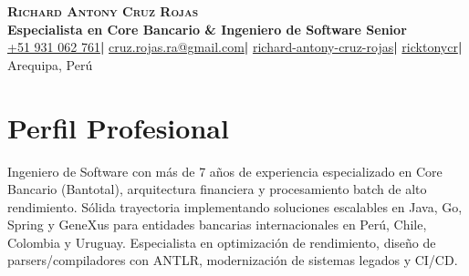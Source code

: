 \documentclass[letterpaper,10pt]{article}
\newcommand{\sep}{\hspace{4.5pt}\textcolor{linkcolor}{\small\textbf{|}}\hspace{4.5pt}}
\begin{document}

\begin{center}
    {\Huge \scshape \textbf{\color{primary} Richard Antony Cruz Rojas}} \\ \vspace{1.5pt}
    {\small \textbf{Especialista en Core Bancario \& Ingeniero de Software Senior}} \\ \vspace{2.5pt}
    \small
    \faPhone*\hspace{2pt}\href{tel:+51931062761}{+51 931 062 761}\sep
    \faEnvelope\hspace{2pt}\href{mailto:cruz.rojas.ra@gmail.com}{cruz.rojas.ra@gmail.com}\sep
    \faLinkedin\hspace{2pt}\href{https://www.linkedin.com/in/richard-antony-cruz-rojas/}{richard-antony-cruz-rojas}\sep
    \faGithub\hspace{2pt}\href{https://github.com/ricktonycr}{ricktonycr}\sep
    \faMapMarker*\hspace{2pt}Arequipa, Perú
\end{center}


\section{Perfil Profesional}
  \vspace{0.5pt}
  \small{
    Ingeniero de Software con más de 7 años de experiencia especializado en Core Bancario (Bantotal), arquitectura financiera y procesamiento batch de alto rendimiento. Sólida trayectoria implementando soluciones escalables en Java, Go, Spring y GeneXus para entidades bancarias internacionales en Perú, Chile, Colombia y Uruguay. Especialista en optimización de rendimiento, diseño de parsers/compiladores con ANTLR, modernización de sistemas legados y CI/CD.
  }
  \vspace{1pt}

\end{document}
